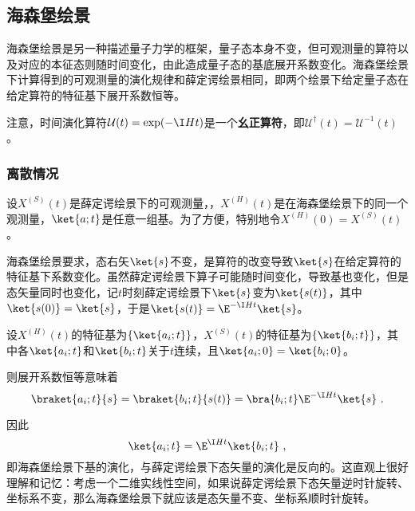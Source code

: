 \subsection{海森堡绘景}

海森堡绘景是另一种描述量子力学的框架，量子态本身不变，但可观测量的算符以及对应的本征态则随时间变化，由此造成量子态的基底展开系数变化。海森堡绘景下计算得到的可观测量的演化规律和薛定谔绘景相同，即两个绘景下给定量子态在给定算符的特征基下展开系数恒等。

注意，时间演化算符$\mathcal{U}(t)=\exp(-\I Ht)$是一个\textbf{幺正算符}，即$\mathcal{U}^\dagger(t)=\mathcal{U}^{-1}(t)$。

\subsubsection{离散情况}



设$X^{(S)}(t)$是薛定谔绘景下的可观测量，，$X^{(H)}(t)$是在海森堡绘景下的同一个观测量，$\ket{a; t}$是任意一组基。为了方便，特别地令$X^{(H)}(0)=X^{(S)}(t)$。


海森堡绘景要求，态右矢$\ket{s}$不变，是算符的改变导致$\ket{s}$在给定算符的特征基下系数变化。虽然薛定谔绘景下算子可能随时间变化，导致基也变化，但是态矢量同时也变化，记$t$时刻薛定谔绘景下$\ket{s}$变为$\ket{s(t)}$，其中$\ket{s(0)}=\ket{s}$，于是$\ket{s(t)}=\E^{-\I H t}\ket{s}$。



设$X^{(H)}(t)$的特征基为$\{\ket{a_i;t}\}$，$X^{(S)}(t)$的特征基为$\{\ket{b_i; t}\}$，其中各$\ket{a_i; t}$和$\ket{b_i; t}$关于$t$连续，且$\ket{a_i; 0}=\ket{b_i; 0}$。

则展开系数恒等意味着
\begin{equation}
\braket{a_i; t}{s} = \braket{b_i; t}{s(t)} = \bra{b_i; t}\E^{-\I H t}\ket{s}~. 
\end{equation}

因此
\begin{equation}\label{eq_HsbPic_3}
\ket{a_i; t} = \E^{\I H t}\ket{b_i; t}~, 
\end{equation}
即海森堡绘景下基的演化，与薛定谔绘景下态矢量的演化是反向的。这直观上很好理解和记忆：考虑一个二维实线性空间，如果说薛定谔绘景下态矢量逆时针旋转、坐标系不变，那么海森堡绘景下就应该是态矢量不变、坐标系顺时针旋转。




